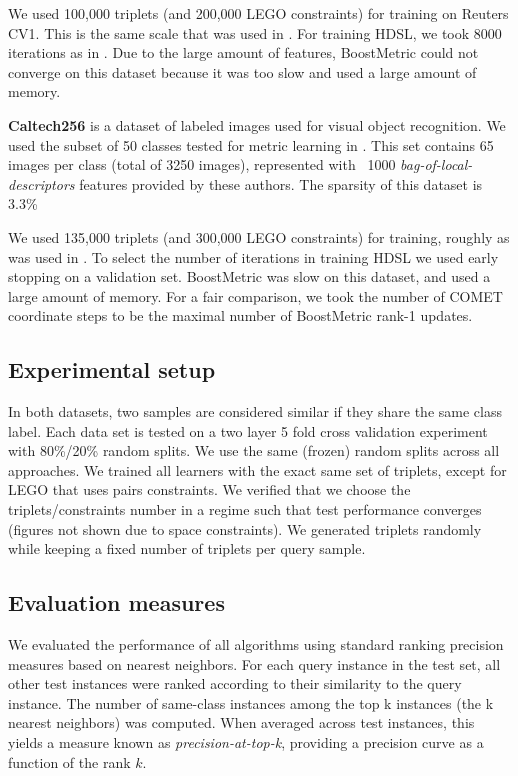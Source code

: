 \documentclass{article}
\begin{document}
We used 100,000 triplets (and 200,000 LEGO constraints) for training on Reuters CV1. This is the same scale that was used in \cite{hdsl}. For training HDSL, we took 8000 iterations as in \cite{hdsl}. Due to the large amount of features, BoostMetric could not converge on this dataset because it was too slow and used a large amount of memory.

\textbf{Caltech256} is a dataset of labeled images used for visual object recognition. We used the subset of 50 classes tested for metric learning in \cite{OASIS}. This set contains 65 images per class (total of 3250 images), represented with ~1000 \textit{bag-of-local-descriptors} features provided by these authors. The sparsity of this dataset is 3.3\%

We used 135,000 triplets (and 300,000 LEGO constraints) for training, roughly as was used in \cite{OASIS}. To select the number of iterations in training HDSL we used early stopping on a validation set. BoostMetric was slow on this dataset, and used a large amount of memory. For a fair comparison, we took the number of COMET coordinate steps to be the maximal number of BoostMetric rank-1 updates.

\subsection{Experimental setup}
In both datasets, two samples are considered similar if they share the same class label. Each data set is tested on a two layer 5 fold cross validation experiment with 80\%/20\% random splits. We use the same (frozen) random splits across all approaches. We trained all learners with the exact same set of triplets, except for LEGO that uses pairs constraints. We verified that we choose the triplets/constraints number in a regime such that test performance converges (figures not shown due to space constraints). We generated triplets randomly while keeping a fixed number of triplets per query sample.

\subsection{Evaluation measures}
We evaluated the performance of all algorithms using standard ranking precision measures based on nearest neighbors. For each query instance in the test set, all other test instances were ranked according to their similarity to the query instance. The number of same-class instances
among the top k instances (the k nearest neighbors) was computed. When averaged across test
instances, this yields a measure known as \textit{precision-at-top-k},
providing a precision curve as a function of the rank $k$.
\end{document}
